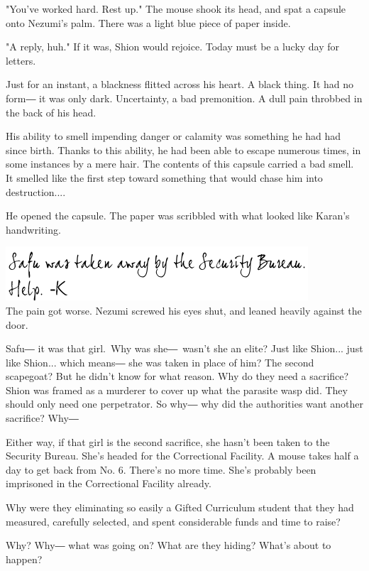 "You've worked hard. Rest up." The mouse shook its head, and spat a
capsule onto Nezumi's palm. There was a light blue piece of paper
inside.

"A reply, huh." If it was, Shion would rejoice. Today must be a lucky
day for letters.

Just for an instant, a blackness flitted across his heart. A black
thing. It had no form― it was only dark. Uncertainty, a bad premonition.
A dull pain throbbed in the back of his head.

His ability to smell impending danger or calamity was something he had
had since birth. Thanks to this ability, he had been able to escape
numerous times, in some instances by a mere hair. The contents of this
capsule carried a bad smell. It smelled like the first step toward
something that would chase him into destruction....

He opened the capsule. The paper was scribbled with what looked like
Karan's handwriting.

\includegraphics{Images/memo5.png}\\

The pain got worse. Nezumi screwed his eyes shut, and leaned heavily
against the door.

Safu― it was that girl.~Why was she―~wasn't she an elite? Just like
Shion... just like Shion... which means― she was taken in place of him?
The second scapegoat? But he didn't know for what reason. Why do they
need a sacrifice? Shion was framed as a murderer to cover up what the
parasite wasp did. They should only need one perpetrator. So why― why
did the authorities want another sacrifice? Why―

Either way, if that girl is the second sacrifice, she hasn't been taken
to the Security Bureau. She's headed for the Correctional Facility. A
mouse takes half a day to get back from No. 6. There's no more time.
She's probably been imprisoned in the Correctional Facility already.

Why were they eliminating so easily a Gifted Curriculum student that
they had measured, carefully selected, and spent considerable funds and
time to raise?

Why? Why― what was going on? What are they hiding? What's about to
happen?


